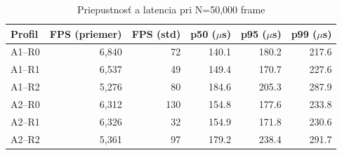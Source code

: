 \begin{table}[htbp]
\centering
\caption{Priepustnosť a latencia pri N=50,000 frame}
\label{tab:throughput}
\begin{tabular}{l r r r r r}
\toprule
Profil & FPS (priemer) & FPS (std) & p50 ($\mu$s) & p95 ($\mu$s) & p99 ($\mu$s) \\
\midrule
  A1--R0 & 6,840 & 72 & 140.1 & 180.2 & 217.6 \\
  A1--R1 & 6,537 & 49 & 149.4 & 170.7 & 227.6 \\
  A1--R2 & 5,276 & 80 & 184.6 & 205.3 & 287.9 \\
  A2--R0 & 6,312 & 130 & 154.8 & 177.6 & 233.8 \\
  A2--R1 & 6,326 & 32 & 154.9 & 171.8 & 230.6 \\
  A2--R2 & 5,361 & 97 & 179.2 & 238.4 & 291.7 \\
\bottomrule
\end{tabular}
\end{table}